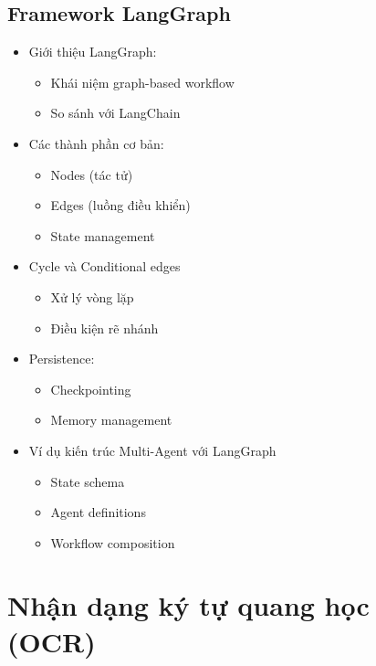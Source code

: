 \subsection{Framework LangGraph}
\begin{itemize}
    \item Giới thiệu LangGraph:
    \begin{itemize}
        \item Khái niệm graph-based workflow
        \item So sánh với LangChain
    \end{itemize}
    \item Các thành phần cơ bản:
    \begin{itemize}
        \item Nodes (tác tử)
        \item Edges (luồng điều khiển)
        \item State management
    \end{itemize}
    \item Cycle và Conditional edges
    \begin{itemize}
        \item Xử lý vòng lặp
        \item Điều kiện rẽ nhánh
    \end{itemize}
    \item Persistence:
    \begin{itemize}
        \item Checkpointing
        \item Memory management
    \end{itemize}
    \item Ví dụ kiến trúc Multi-Agent với LangGraph
    \begin{itemize}
        \item State schema
        \item Agent definitions
        \item Workflow composition
    \end{itemize}
\end{itemize}

\section{Nhận dạng ký tự quang học (OCR)}

